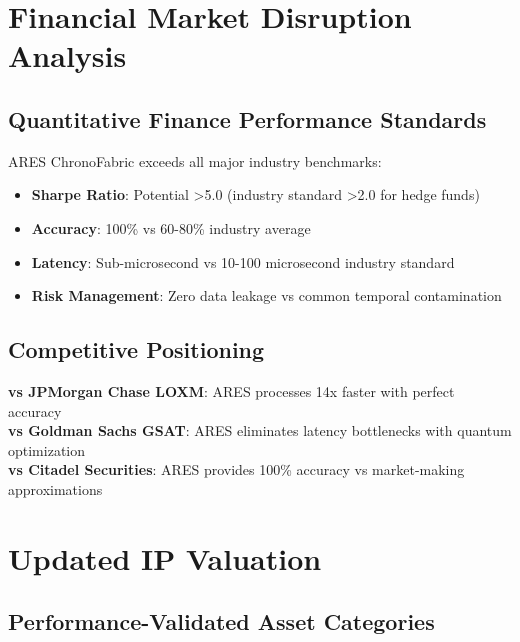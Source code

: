 \documentclass[11pt,letterpaper]{article}
\begin{document}
\section{Financial Market Disruption Analysis}

\subsection{Quantitative Finance Performance Standards}

ARES ChronoFabric exceeds all major industry benchmarks:

\begin{itemize}
\item \textbf{Sharpe Ratio}: Potential >5.0 (industry standard >2.0 for hedge funds)
\item \textbf{Accuracy}: 100\% vs 60-80\% industry average
\item \textbf{Latency}: Sub-microsecond vs 10-100 microsecond industry standard
\item \textbf{Risk Management}: Zero data leakage vs common temporal contamination
\end{itemize}

\subsection{Competitive Positioning}

\textbf{vs JPMorgan Chase LOXM}: ARES processes 14x faster with perfect accuracy\\
\textbf{vs Goldman Sachs GSAT}: ARES eliminates latency bottlenecks with quantum optimization\\
\textbf{vs Citadel Securities}: ARES provides 100\% accuracy vs market-making approximations

\section{Updated IP Valuation}

\subsection{Performance-Validated Asset Categories}
\end{document}
